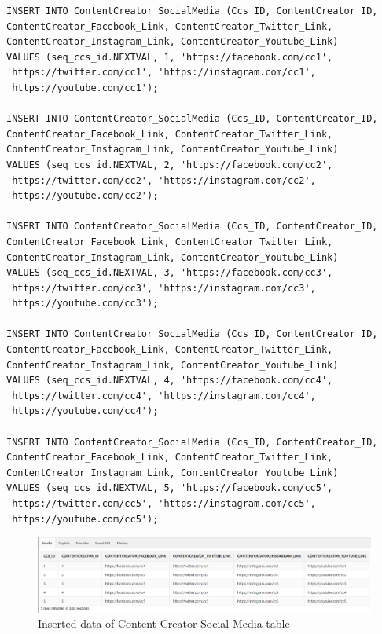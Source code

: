 \begin{lstlisting}[caption={Inserting data into ContentCreator\_SocialMedia tables},label={lst:insert_ContentCreator_SocialMedia}]
INSERT INTO ContentCreator_SocialMedia (Ccs_ID, ContentCreator_ID, ContentCreator_Facebook_Link, ContentCreator_Twitter_Link, ContentCreator_Instagram_Link, ContentCreator_Youtube_Link)
VALUES (seq_ccs_id.NEXTVAL, 1, 'https://facebook.com/cc1', 'https://twitter.com/cc1', 'https://instagram.com/cc1', 'https://youtube.com/cc1');

INSERT INTO ContentCreator_SocialMedia (Ccs_ID, ContentCreator_ID, ContentCreator_Facebook_Link, ContentCreator_Twitter_Link, ContentCreator_Instagram_Link, ContentCreator_Youtube_Link)
VALUES (seq_ccs_id.NEXTVAL, 2, 'https://facebook.com/cc2', 'https://twitter.com/cc2', 'https://instagram.com/cc2', 'https://youtube.com/cc2');

INSERT INTO ContentCreator_SocialMedia (Ccs_ID, ContentCreator_ID, ContentCreator_Facebook_Link, ContentCreator_Twitter_Link, ContentCreator_Instagram_Link, ContentCreator_Youtube_Link)
VALUES (seq_ccs_id.NEXTVAL, 3, 'https://facebook.com/cc3', 'https://twitter.com/cc3', 'https://instagram.com/cc3', 'https://youtube.com/cc3');

INSERT INTO ContentCreator_SocialMedia (Ccs_ID, ContentCreator_ID, ContentCreator_Facebook_Link, ContentCreator_Twitter_Link, ContentCreator_Instagram_Link, ContentCreator_Youtube_Link)
VALUES (seq_ccs_id.NEXTVAL, 4, 'https://facebook.com/cc4', 'https://twitter.com/cc4', 'https://instagram.com/cc4', 'https://youtube.com/cc4');

INSERT INTO ContentCreator_SocialMedia (Ccs_ID, ContentCreator_ID, ContentCreator_Facebook_Link, ContentCreator_Twitter_Link, ContentCreator_Instagram_Link, ContentCreator_Youtube_Link)
VALUES (seq_ccs_id.NEXTVAL, 5, 'https://facebook.com/cc5', 'https://twitter.com/cc5', 'https://instagram.com/cc5', 'https://youtube.com/cc5');
\end{lstlisting}
\begin{figure}[H]
    \centering
    \includegraphics[width=1\textwidth]{images/TableData/CONTENTCREATOR_SOCIALMEDIA.png}
    \caption{Inserted data of Content Creator Social Media table}
\end{figure}

